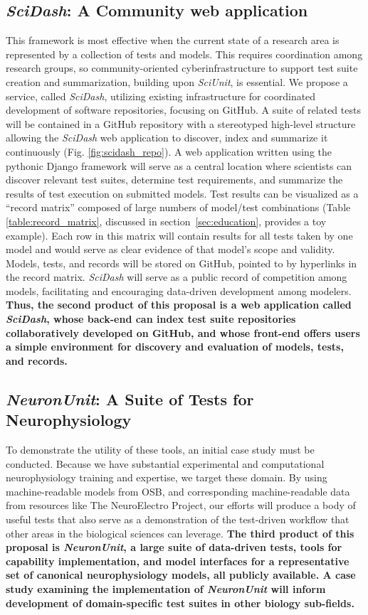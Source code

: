 \documentclass[11pt,letterpaper]{article}
\begin{document}
\subsection{\textit{SciDash}: A Community web application}\label{sec:scidash}
This framework is most effective when the current state of a research area is represented by a collection of tests and models. This requires coordination among research groups, so community-oriented cyberinfrastructure to support test suite creation and summarization, building upon \textit{SciUnit}, is essential.
We propose a service, called \textit{SciDash}, utilizing existing infrastructure for coordinated development of software repositories, focusing on GitHub\cite{github_url}\cite{ram_git_2013}. A suite of related tests will be contained in a GitHub repository with a stereotyped high-level structure allowing the \textit{SciDash} web application to discover, index and summarize it continuously (Fig. \ref{fig:scidash_repo}).
A web application written using the pythonic Django framework\cite{django_url} will serve as a central location where scientists can discover relevant test suites, determine test requirements, and summarize the results of test execution on submitted models. Test results can be visualized as a ``record matrix'' composed of large numbers of model/test combinations (Table \ref{table:record_matrix}, discussed in section~\ref{sec:education}, provides a toy example).  Each row in this matrix will contain results for all tests taken by one model and would serve as clear evidence of that model's scope and validity.  Models, tests, and records will be stored on GitHub, pointed to by hyperlinks in the record matrix. \textit{SciDash} will serve as a public record of competition among models, facilitating and encouraging data-driven development among modelers.
\textbf{Thus, the second product of this proposal is a web application called \textit{SciDash}, whose back-end can index test suite repositories collaboratively developed on GitHub, and whose front-end offers users a simple environment for discovery and evaluation of models, tests, and records.}  

\subsection{\textit{NeuronUnit}: A Suite of Tests for Neurophysiology}\label{sec:neuronunit}
To demonstrate the utility of these tools, an initial case study must be conducted. Because we have substantial experimental and computational neurophysiology training and expertise, we target these domain. By using machine-readable models from OSB, and corresponding machine-readable data from resources like The NeuroElectro Project\cite{neuroelectro_url}, our efforts will produce a body of useful tests that also serve as a demonstration of the test-driven workflow that other areas in the biological sciences can leverage.  \textbf{The third product of this proposal is \textit{NeuronUnit}, a large suite of data-driven tests, tools for capability implementation, and model interfaces for a representative set of canonical neurophysiology models, all publicly available. A case study examining the implementation of \textit{NeuronUnit} will inform development of domain-specific test suites in other biology sub-fields.}
\end{document}
